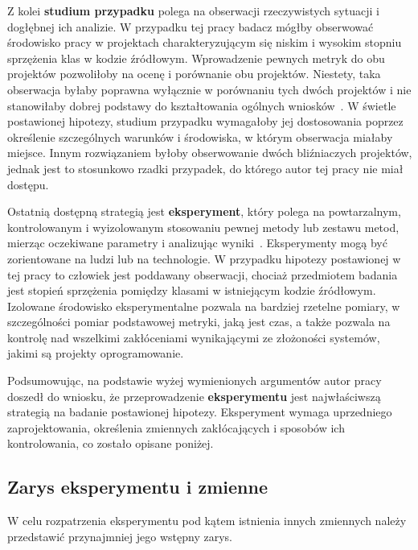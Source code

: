 Z kolei \textbf{studium przypadku} polega na obserwacji rzeczywistych sytuacji i dogłębnej ich analizie.
W przypadku tej pracy badacz mógłby obserwować środowisko pracy w projektach charakteryzującym się niskim i wysokim
stopniu sprzężenia klas w kodzie źródłowym.
Wprowadzenie pewnych metryk do obu projektów pozwoliłoby na ocenę i porównanie obu projektów.
Niestety, taka obserwacja byłaby poprawna wyłącznie w porównaniu tych dwóch projektów i nie stanowiłaby dobrej
podstawy do kształtowania ogólnych wniosków~\cite{wohlin2012experimentation}.
W świetle postawionej hipotezy, studium przypadku wymagałoby jej dostosowania poprzez określenie szczególnych
warunków i środowiska, w którym obserwacja miałaby miejsce.
Innym rozwiązaniem byłoby obserwowanie dwóch bliźniaczych projektów, jednak jest to stosunkowo rzadki przypadek, do
którego autor tej pracy nie miał dostępu.

Ostatnią dostępną strategią jest \textbf{eksperyment}, który polega na powtarzalnym, kontrolowanym i wyizolowanym
stosowaniu pewnej metody lub zestawu metod, mierząc oczekiwane parametry i analizując wyniki~\cite{wohlin2012experimentation}.
Eksperymenty mogą być zorientowane na ludzi lub na technologie.
W przypadku hipotezy postawionej w tej pracy to człowiek jest poddawany obserwacji, chociaż przedmiotem badania jest
stopień sprzężenia pomiędzy klasami w istniejącym kodzie źródłowym.
Izolowane środowisko eksperymentalne pozwala na bardziej rzetelne pomiary, w szczególności pomiar podstawowej
metryki, jaką jest czas, a także pozwala na kontrolę nad wszelkimi zakłóceniami wynikającymi ze złożoności systemów,
jakimi są projekty oprogramowanie.

Podsumowując, na podstawie wyżej wymienionych argumentów autor pracy doszedł do wniosku, że przeprowadzenie
\textbf{eksperymentu} jest najwłaściwszą strategią na badanie postawionej hipotezy.
Eksperyment wymaga uprzedniego zaprojektowania, określenia zmiennych zakłócających i sposobów ich kontrolowania, co
zostało opisane poniżej.

\subsection{Zarys eksperymentu i zmienne}
\label{subsec:zmienne}

W celu rozpatrzenia eksperymentu pod kątem istnienia innych zmiennych należy przedstawić przynajmniej jego wstępny
zarys.


